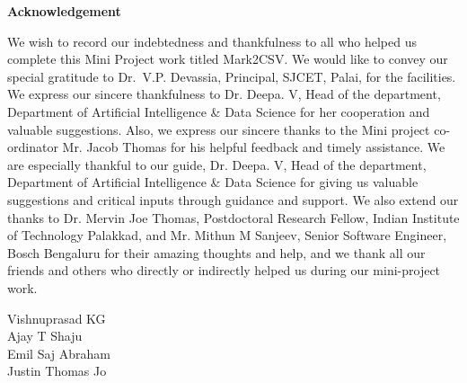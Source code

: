 \thispagestyle{empty}
\begin{center}
  \vspace*{1cm}
  \textbf{\large Acknowledgement}
\end{center}
We wish to record our indebtedness and thankfulness to all who helped us complete this Mini Project work titled Mark2CSV. We would like to convey our special gratitude to Dr.~V.P. Devassia, Principal, SJCET, Palai, for the facilities. We express our sincere thankfulness to Dr. Deepa. V, Head of the department, Department of Artificial Intelligence \& Data Science for her cooperation and valuable suggestions. Also, we express our sincere thanks to the Mini project co-ordinator Mr. Jacob Thomas for his helpful feedback and timely assistance.
We are especially thankful to our guide, Dr. Deepa. V, Head of the department, Department of Artificial Intelligence \& Data Science for giving us valuable suggestions and critical inputs through guidance and support. We also extend our thanks to Dr. Mervin Joe Thomas, Postdoctoral Research Fellow, Indian Institute of Technology Palakkad, and Mr. Mithun M Sanjeev, Senior Software Engineer, Bosch Bengaluru for their amazing thoughts and help, and we thank all our friends and others who directly or indirectly helped us during our mini-project work.
 \\
\begin{flushright}
Vishnuprasad KG \\
Ajay T Shaju \\
Emil Saj Abraham \\
Justin Thomas Jo
\end{flushright}



\newpage
\thispagestyle{empty}
 

\newpage

